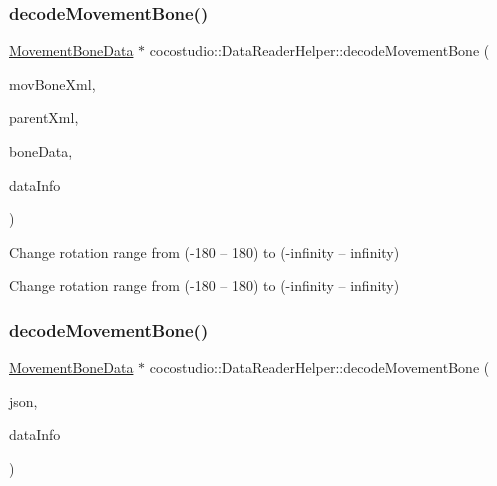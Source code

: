 \subsubsection{\texorpdfstring{decode\+Movement\+Bone()}{decodeMovementBone()}\hspace{0.1cm}{\footnotesize\ttfamily [1/3]}}
{\footnotesize\ttfamily \hyperlink{classcocostudio_1_1MovementBoneData}{Movement\+Bone\+Data} $\ast$ cocostudio\+::\+Data\+Reader\+Helper\+::decode\+Movement\+Bone (\begin{DoxyParamCaption}\item[{\hyperlink{classtinyxml2_1_1XMLElement}{tinyxml2\+::\+X\+M\+L\+Element} $\ast$}]{mov\+Bone\+Xml,  }\item[{\hyperlink{classtinyxml2_1_1XMLElement}{tinyxml2\+::\+X\+M\+L\+Element} $\ast$}]{parent\+Xml,  }\item[{\hyperlink{classcocostudio_1_1BoneData}{Bone\+Data} $\ast$}]{bone\+Data,  }\item[{\hyperlink{structcocostudio_1_1DataReaderHelper_1_1__DataInfo}{Data\+Info} $\ast$}]{data\+Info }\end{DoxyParamCaption})\hspace{0.3cm}{\ttfamily [static]}}

Change rotation range from (-\/180 -- 180) to (-\/infinity -- infinity)

Change rotation range from (-\/180 -- 180) to (-\/infinity -- infinity) \mbox{\label{classcocostudio_1_1DataReaderHelper_aee6903dd300cad7e2a5026efb81c07e3}} 
\subsubsection{\texorpdfstring{decode\+Movement\+Bone()}{decodeMovementBone()}\hspace{0.1cm}{\footnotesize\ttfamily [2/3]}}
{\footnotesize\ttfamily \hyperlink{classcocostudio_1_1MovementBoneData}{Movement\+Bone\+Data} $\ast$ cocostudio\+::\+Data\+Reader\+Helper\+::decode\+Movement\+Bone (\begin{DoxyParamCaption}\item[{const rapidjson\+::\+Value \&}]{json,  }\item[{\hyperlink{structcocostudio_1_1DataReaderHelper_1_1__DataInfo}{Data\+Info} $\ast$}]{data\+Info }\end{DoxyParamCaption})\hspace{0.3cm}{\ttfamily [static]}}

